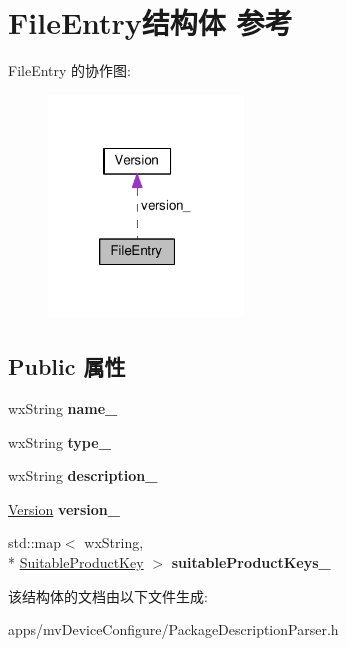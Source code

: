 \hypertarget{struct_file_entry}{\section{File\+Entry结构体 参考}
\label{struct_file_entry}
}


File\+Entry 的协作图\+:
\nopagebreak
\begin{figure}[H]
\begin{center}
\leavevmode
\includegraphics[width=147pt]{struct_file_entry__coll__graph}
\end{center}
\end{figure}
\subsection*{Public 属性}
\begin{DoxyCompactItemize}
\item 
\hypertarget{struct_file_entry_ace9f2ab46810de3ea4d33a4d72951017}{wx\+String {\bfseries name\+\_\+}}\label{struct_file_entry_ace9f2ab46810de3ea4d33a4d72951017}

\item 
\hypertarget{struct_file_entry_a95f1e7eb2439680853f070bbea3f5e6d}{wx\+String {\bfseries type\+\_\+}}\label{struct_file_entry_a95f1e7eb2439680853f070bbea3f5e6d}

\item 
\hypertarget{struct_file_entry_ac31bb7d64eb35d84346e41039eccff2a}{wx\+String {\bfseries description\+\_\+}}\label{struct_file_entry_ac31bb7d64eb35d84346e41039eccff2a}

\item 
\hypertarget{struct_file_entry_ac03b3068043afede3ae6c5ed316e2e23}{\hyperlink{struct_version}{Version} {\bfseries version\+\_\+}}\label{struct_file_entry_ac03b3068043afede3ae6c5ed316e2e23}

\item 
\hypertarget{struct_file_entry_ab02dc03d5c66372cb73148ead3aefd9e}{std\+::map$<$ wx\+String, \\*
\hyperlink{struct_suitable_product_key}{Suitable\+Product\+Key} $>$ {\bfseries suitable\+Product\+Keys\+\_\+}}\label{struct_file_entry_ab02dc03d5c66372cb73148ead3aefd9e}

\end{DoxyCompactItemize}


该结构体的文档由以下文件生成\+:\begin{DoxyCompactItemize}
\item 
apps/mv\+Device\+Configure/Package\+Description\+Parser.\+h\end{DoxyCompactItemize}
